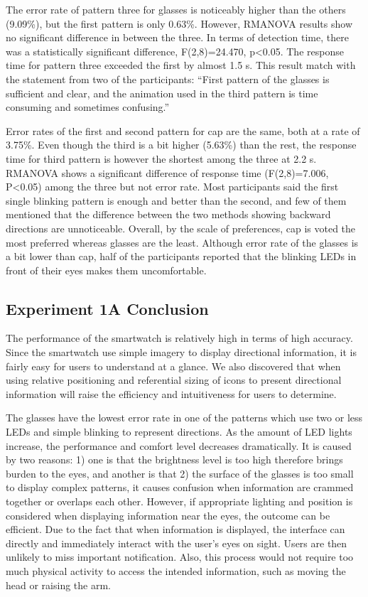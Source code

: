 \documentclass{sigchi}
\begin{document}
The error rate of pattern three for glasses is noticeably higher than the others (9.09\%), but the first pattern is only 0.63\%. However, RMANOVA results show no significant difference in between the three. In terms of detection time, there was a statistically significant difference, F(2,8)=24.470, p\textless0.05. The response time for pattern three exceeded the first by almost 1.5 s. This result match with the statement from two of the participants: \textquotedblleft First pattern of the glasses is sufficient and clear, and the animation used in the third pattern is time consuming and sometimes confusing.\textquotedblright

Error rates of the first and second pattern for cap are the same, both at a rate of 3.75\%. Even though the third is a bit higher (5.63\%) than the rest, the response time for third pattern is however the shortest among the three at 2.2 s. RMANOVA shows a significant difference of response time (F(2,8)=7.006, P\textless0.05) among the three but not error rate. Most participants said the first single blinking pattern is enough and better than the second, and few of them mentioned that the difference between the two methods showing backward directions are unnoticeable. Overall, by the scale of preferences, cap is voted the most preferred whereas glasses are the least. Although error rate of the glasses is a bit lower than cap, half of the participants reported that the blinking LEDs in front of their eyes makes them uncomfortable.

\subsection{Experiment 1A Conclusion}
The performance of the smartwatch is relatively high in terms of high accuracy. Since the smartwatch use simple imagery to display directional information, it is fairly easy for users to understand at a glance. We also discovered that when using relative positioning and referential sizing of icons to present directional information will raise the efficiency and intuitiveness for users to determine.

The glasses have the lowest error rate in one of the patterns which use two or less LEDs and simple blinking to represent directions. As the amount of LED lights increase, the performance and comfort level decreases dramatically. It is caused by two reasons: 1) one is that the brightness level is too high therefore brings burden to the eyes, and another is that 2) the surface of the glasses is too small to display complex patterns, it causes confusion when information are crammed together or overlaps each other. However, if appropriate lighting and position is considered when displaying information near the eyes, the outcome can be efficient. Due to the fact that when information is displayed, the interface can directly and immediately interact with the user's eyes on sight. Users are then unlikely to miss important notification. Also, this process would not require too much physical activity to access the intended information, such as moving the head or raising the arm.
\end{document}
